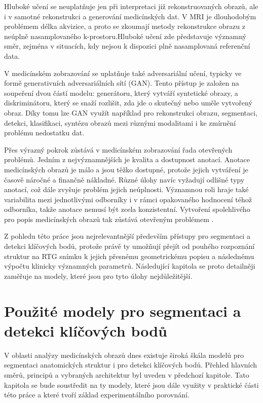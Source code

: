 \documentclass[male,czech,api_bc]{kitheses}
\begin{document}
Hluboké učení se neuplatňuje jen při interpretaci již rekonstruovaných obrazů, ale i v samotné rekonstrukci a generování medicínských dat. V MRI je dlouhodobým problémem délka akvizice, a proto se zkoumají metody rekonstrukce obrazu z neúplně nasamplovaného k-prostoru.Hluboké učení zde představuje významný směr, zejména v situacích, kdy nejsou k dispozici plně nasamplovaná referenční data.\cite{Zeng2021MRI}

V medicínském zobrazování se uplatňuje také adversariální učení, typicky ve formě generativních adversariálních sítí (GAN). Tento přístup je založen na soupeření dvou částí modelu: generátoru, který vytváří syntetické obrazy, a diskriminátoru, který se snaží rozlišit, zda jde o skutečný nebo uměle vytvořený obraz. Díky tomu lze GAN využít například pro rekonstrukci obrazu, segmentaci, detekci, klasifikaci, syntézu obrazů mezi různými modalitami i ke zmírnění problému nedostatku dat.\cite{Yi2019GAN}

Přes výrazný pokrok zůstává v medicínském zobrazování řada otevřených problémů. Jedním z nejvýznamnějších je kvalita a dostupnost anotací. Anotace medicínských obrazů je málo a jsou těžko dostupné, protože jejich vytváření je časově náročné a finančně nákladné. Různé úlohy navíc vyžadují odlišné typy anotací, což dále zvyšuje problém jejich neúplnosti. Významnou roli hraje také variabilita mezi jednotlivými odborníky i v rámci opakovaného hodnocení téhož odborníka, takže anotace nemusí být zcela konzistentní. Vytvoření spolehlivého  pro popis medicínských obrazů tak zůstává otevřeným problémem \cite{Zhou2021Review}.

Z pohledu této práce jsou nejrelevantnější především přístupy pro segmentaci a detekci klíčových bodů, protože právě ty umožňují přejít od pouhého rozpoznání struktur na RTG snímku k jejich přesnému geometrickému popisu a následnému výpočtu klinicky významných parametrů. Následující kapitola se proto detailněji zaměřuje na modely, které jsou pro tyto úlohy nejdůležitější.

\chapter{Použité modely pro segmentaci a detekci klíčových bodů}

V oblasti analýzy medicínských obrazů dnes existuje široká škála modelů pro segmentaci anatomických struktur i pro detekci klíčových bodů. Přehled hlavních směrů, principů a vybraných architektur byl uveden v předchozí kapitole. Tato kapitola se bude soustředit na ty modely, které jsou dále využity v praktické části této práce a které tvoří základ experimentálního porovnání.
\end{document}
